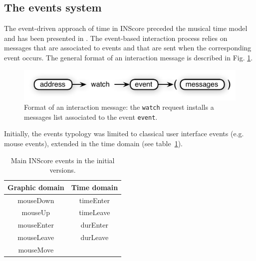 \documentclass[11pt,a4paper]{article}
\newcommand{\OSC}[1]	{{\fontsize{10pt}{10pt} \selectfont\texttt{#1}}}
\begin{document}
\subsection{The events system}
\label{events}

The event-driven approach of time in INScore preceded the musical time model and has been presented in \cite{Fober:13b}. 
The event-based interaction process relies on messages that are associated to events and that are sent when the corresponding event occurs. The general format of an interaction message is described in Fig. \ref{fig:watch}.

\begin{figure}[ht]
\centerline{
	\includegraphics[width=0.95\columnwidth]{imgs/watch}}
\caption{Format of an interaction message: the \OSC{watch} request installs a messages list associated to the event \OSC{event}.}
\label{fig:watch}
\end{figure}

Initially, the events typology was limited to classical user interface events (e.g. mouse events), extended in the time domain (see table~\ref{tbl:evts}). 

\begin{table}[htp]
\begin{center}
\begin{tabular}{c|c}
Graphic domain & Time domain \\
\hline
mouseDown 		& timeEnter	\\
mouseUp			& timeLeave	\\
mouseEnter		& durEnter		\\
mouseLeave		& durLeave		\\
mouseMove		&				\\
\end{tabular}
\end{center}
\caption{Main INScore events in the initial versions.}
\label{tbl:evts}
\end{table}%
\end{document}

